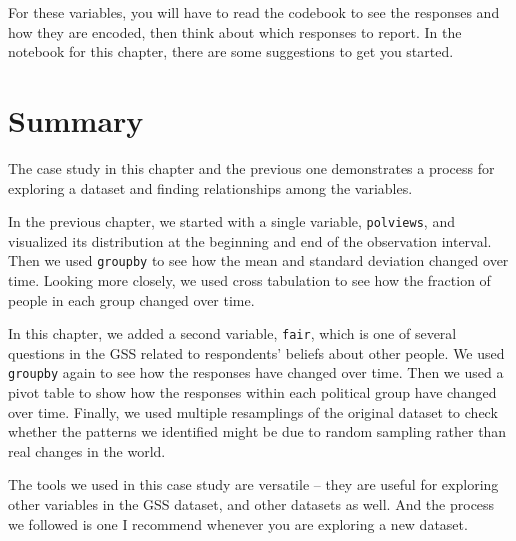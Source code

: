 For these variables, you will have to read the codebook to see the
responses and how they are encoded, then think about which responses to
report. In the notebook for this chapter, there are some suggestions to
get you started.

\hypertarget{summary}{%
\section{Summary}\label{summary}}

The case study in this chapter and the previous one demonstrates a
process for exploring a dataset and finding relationships among the
variables.

In the previous chapter, we started with a single variable,
\passthrough{\lstinline!polviews!}, and visualized its distribution at
the beginning and end of the observation interval. Then we used
\passthrough{\lstinline!groupby!} to see how the mean and standard
deviation changed over time. Looking more closely, we used cross
tabulation to see how the fraction of people in each group changed over
time.

In this chapter, we added a second variable,
\passthrough{\lstinline!fair!}, which is one of several questions in the
GSS related to respondents' beliefs about other people. We used
\passthrough{\lstinline!groupby!} again to see how the responses have
changed over time. Then we used a pivot table to show how the responses
within each political group have changed over time. Finally, we used
multiple resamplings of the original dataset to check whether the
patterns we identified might be due to random sampling rather than real
changes in the world.

The tools we used in this case study are versatile -- they are useful
for exploring other variables in the GSS dataset, and other datasets as
well. And the process we followed is one I recommend whenever you are
exploring a new dataset.

